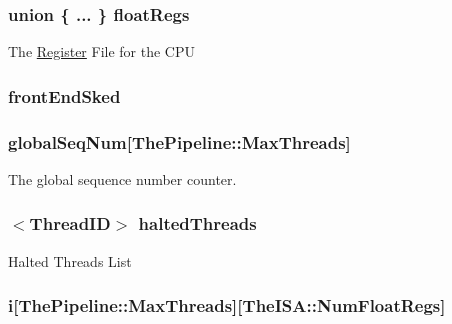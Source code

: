 \label{classInOrderCPU_a22a54b30ea66b2e4740a1a3d55de098f}
\hypertarget{classInOrderCPU_ad85bf1756055c7ee62e445619cdb3750}{
\subsubsection[{floatRegs}]{\setlength{\rightskip}{0pt plus 5cm}union \{ ... \}   {\bf floatRegs}}}
\label{classInOrderCPU_ad85bf1756055c7ee62e445619cdb3750}
The \hyperlink{classRegister}{Register} File for the CPU \hypertarget{classInOrderCPU_a03c10522156687013f75c1bdaa96d04f}{
\subsubsection[{frontEndSked}]{ {\bf frontEndSked}}}
\label{classInOrderCPU_a03c10522156687013f75c1bdaa96d04f}
\hypertarget{classInOrderCPU_a7df535223a2576eed74b77ef2e59a657}{
\subsubsection[{globalSeqNum}]{ {\bf globalSeqNum}\mbox{[}{\bf ThePipeline::MaxThreads}\mbox{]}}}
\label{classInOrderCPU_a7df535223a2576eed74b77ef2e59a657}
The global sequence number counter. \hypertarget{classInOrderCPU_ac4a971a8b09e053f4bf9bfcd6748995d}{
\subsubsection[{haltedThreads}]{$<${\bf ThreadID}$>$ {\bf haltedThreads}}}
\label{classInOrderCPU_ac4a971a8b09e053f4bf9bfcd6748995d}
Halted Threads List \hypertarget{classInOrderCPU_a6a5c774a90c1d03f1cfc418f4c9876e2}{
\subsubsection[{i}]{ {\bf i}\mbox{[}{\bf ThePipeline::MaxThreads}\mbox{]}\mbox{[}TheISA::NumFloatRegs\mbox{]}}}
